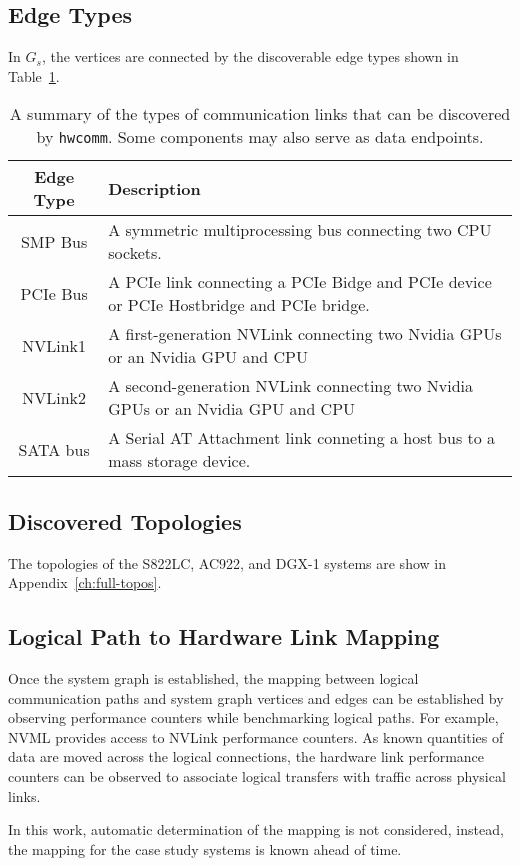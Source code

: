 \subsection{Edge Types}
\label{sec:system-edges}

In $G_s$, the vertices are connected by the discoverable edge types shown in Table~\ref{tab:topology-edges}.

\begin{table}[ht]
    \centering
    \caption[Discoverable edge types]{
        A summary of the types of communication links that can be discovered by \texttt{hwcomm}.
        Some components may also serve as data endpoints.
    }
    \label{tab:topology-edges}
    \begin{tabularx}{\linewidth}{ c  >{\centering\arraybackslash}X }
    \hline
    \textbf{Edge Type} & \textbf{Description} \\ \hline
    SMP Bus            & A symmetric multiprocessing bus connecting two CPU sockets. \\ \hline
    PCIe Bus           & A PCIe link connecting a PCIe Bidge and PCIe device or PCIe Hostbridge and PCIe bridge. \\ \hline
    NVLink1            & A first-generation NVLink connecting two Nvidia GPUs or an Nvidia GPU and CPU \\ \hline
    NVLink2            & A second-generation NVLink connecting two Nvidia GPUs or an Nvidia GPU and CPU \\ \hline
    SATA bus           & A Serial AT Attachment link conneting a host bus to a mass storage device. \\ \hline
    \end{tabularx}
\end{table}

\subsection{Discovered Topologies}

The topologies of the S822LC, AC922, and DGX-1 systems are show in Appendix~\ref{ch:full-topos}.


\subsection{Logical Path to Hardware Link Mapping}
\label{sec:logical-hardware-mapping}

Once the system graph is established, the mapping between logical communication paths and system graph vertices and edges can be established by observing performance counters while benchmarking logical paths.
For example, NVML provides access to NVLink performance counters.
As known quantities of data are moved across the logical connections, the hardware link performance counters can be observed to associate logical transfers with traffic across physical links.

In this work, automatic determination of the mapping is not considered, instead, the mapping for the case study systems is known ahead of time.